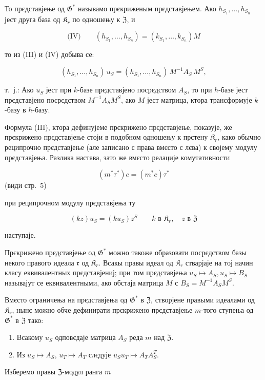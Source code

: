 \documentclass[11pt]{article}
\begin{document}
То прєдставјење од \(\mathfrak{G}^*\) называмо прєкриженым прєдставјењем. Ако \(h_{S_1}, \ldots, h_{S_n}\) јест друга база од \(\mathfrak{K}_r\) по одношењу к \(\mathfrak{Z}\), и

\[
\text{(IV)}\qquad (h_{S_1}, \ldots, h_{S_n}) = (k_{S_1}, \ldots, k_{S_n})M
\]

то из (III) и (IV) добыва се:

\[(h_{S_1},\ldots,h_{S_n})\,u_S=(h_{S_1},\ldots,h_{S_n})\,M^{-1}A_S\,M^S,\]

т.~ј.: Ако \(u_S\) јест при \(k\)-базе прєдставјено посрєдством \(A_S\), то при \(h\)-базе јест прєдставјено посрєдством \(M^{-1}A_SM^S\), ако \(M\) јест матрица, ктора трансформује \(k\)-базу в \(h\)-базу.

Формула (III), ктора дефинујеме прєкрижено прєдставјење, показује, же прєкрижено прєдставјење стоји в подобном одношењу к прстену \(\mathfrak K_r\), како обычно реципрочно прєдставјење (але записано с права вмєсто с лєва) к својему модулу прєдставјења. Разлика настава, зато же вмєсто релације комутативности

\[(m^*\tau^*)c = (m^*c)\tau^*\]
(види стр.~5)

при реципрочном модулу прєдставјења ту

\[
(kz)u_S=(ku_S)z^S\qquad k\text{ в }\mathfrak K_r,\quad z\text{ в }\mathfrak Z
\]

наступаје.

Прєкрижено прєдставјење од \(\mathfrak{G}^*\) можно такоже образовати посрєдством базы некого правого идеала \(\mathfrak r\) од \(\mathfrak{K}_r\). Всакы правы идеал од \(\mathfrak{K}_r\) стварјаје на тој начин класу еквивалентных прєдставјениј; при том прєдставјења \(u_S \mapsto A_S, u_S \mapsto B_S\) называјут се еквивалентными, ако обстаја матрица \(M\) с \(B_S = M^{-1}A_SM^S\).

Вмєсто ограничења на прєдставјења од \(\mathfrak G^*\) в \(\mathfrak Z\), створјене правыми идеалами од \(\mathfrak K_r\), нынє можно обче дефинирати прєкрижено прєдставјење \(m\)-того ступења од \(\mathfrak G^*\) в \(\mathfrak Z\) тако:

\begin{enumerate}
\item Всакому \(u_S\) одповєдаје матрица \(A_S\) реда \(m\) над \(\mathfrak Z\).
\item Из \(u_S \mapsto A_S\), \(u_T \mapsto A_T\) слєдује \(u_Su_T \mapsto A_TA_S^T\).
\end{enumerate}

Изберемо правы \(\mathfrak Z\)-модул ранга \(m\)
\end{document}
